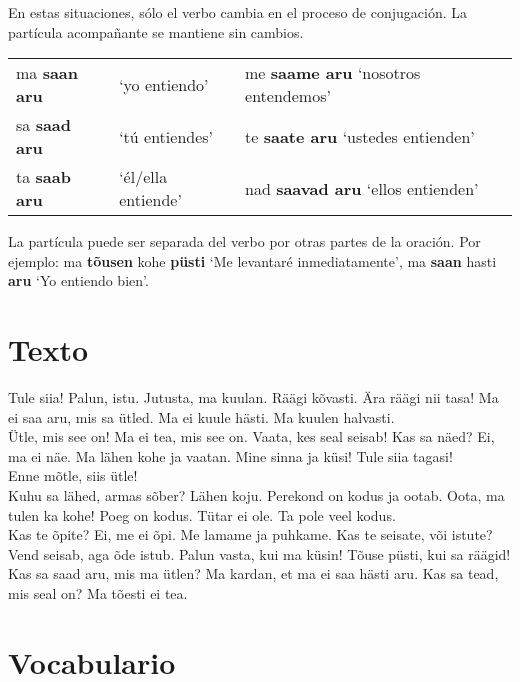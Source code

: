 En estas situaciones, sólo el verbo cambia en el proceso de conjugación. La partícula acompañante se mantiene sin cambios.

\begin{center}
\begin{tabular}{ l l l l }
	ma \textbf{saan aru} & `yo entiendo' 		& me \textbf{saame aru} `nosotros entendemos' \\
	sa \textbf{saad aru} & `tú entiendes'		& te \textbf{saate aru}	`ustedes entienden' \\
	ta \textbf{saab aru} & `él/ella entiende' 	& nad \textbf{saavad aru} `ellos entienden'
\end{tabular}	
\end{center}

La partícula puede ser separada del verbo por otras partes de la oración. Por ejemplo: ma \textbf{tõusen} kohe \textbf{püsti} `Me levantaré inmediatamente', ma \textbf{saan} hasti \textbf{aru} `Yo entiendo bien'.

\section*{\Large{Texto}}

Tule siia! Palun, istu. Jutusta, ma kuulan. Räägi kõvasti. Ära räägi nii tasa! Ma ei saa aru, mis sa ütled. Ma ei kuule hästi. Ma kuulen halvasti.\\
Ütle, mis see on! Ma ei tea, mis see on. Vaata, kes seal seisab! Kas sa näed? Ei, ma ei näe. Ma lähen kohe ja vaatan. Mine sinna ja küsi! Tule siia tagasi!\\
Enne mõtle, siis ütle!\\

Kuhu sa lähed, armas sõber? Lähen koju. Perekond on kodus ja ootab. Oota, ma tulen ka kohe! Poeg on kodus. Tütar ei ole. Ta pole veel kodus.\\
Kas te õpite? Ei, me ei õpi. Me lamame ja puhkame. Kas te seisate, või istute? Vend seisab, aga õde istub. Palun vasta, kui ma küsin! Tõuse püsti, kui sa räägid! Kas sa saad aru, mis ma ütlen? Ma kardan, et ma ei saa hästi aru. Kas sa tead, mis seal on? Ma tõesti ei tea.

\section*{\Large{Vocabulario}}

